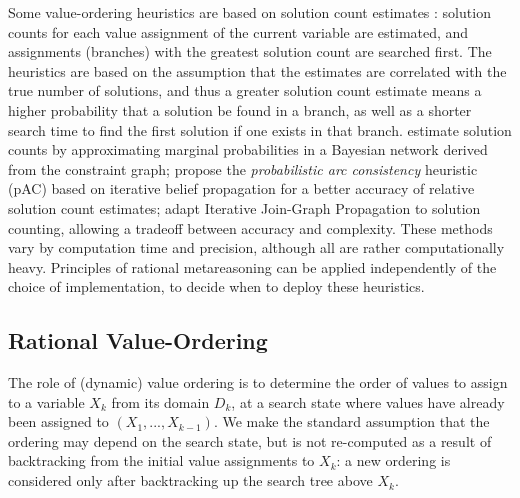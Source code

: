 Some value-ordering heuristics are based on solution count estimates
\cite{Meisels.solcount,HorschHavens.pac,Kask.solcount}: solution
counts for each value assignment of the current variable are
estimated, and assignments (branches) with the greatest solution count
are searched first.  The heuristics are based on the assumption that
the estimates are correlated with the true number of solutions, and
thus a greater solution count estimate means a higher probability that
a solution be found in a branch, as well as a shorter search time to
find the first solution if one exists in that
branch. \cite{Meisels.solcount} estimate solution counts by
approximating marginal probabilities in a Bayesian network derived
from the constraint graph; \cite{HorschHavens.pac} propose the
\emph{probabilistic arc consistency} heuristic (pAC) based on
iterative belief propagation for a better accuracy of relative
solution count estimates; \cite{Kask.solcount} adapt Iterative
Join-Graph Propagation to solution counting, allowing a tradeoff
between accuracy and complexity. These methods vary by computation
time and precision, although all are rather computationally
heavy. Principles of rational metareasoning can be applied
independently of the choice of implementation, to decide when
to deploy these heuristics.

\subsection{Rational Value-Ordering}
\label{sec:generic}

The role of (dynamic) value ordering is to determine the order of
values to assign to a variable $X_k$ from its domain $D_k$, at a
search state where values have already been assigned to $(X_1, ...,
X_{k-1})$. We make the standard assumption that the ordering may
depend on the search state, but is not re-computed as a result of
backtracking from the initial value assignments to $X_k$: a new
ordering is considered only after backtracking up the search tree
above $X_k$.

